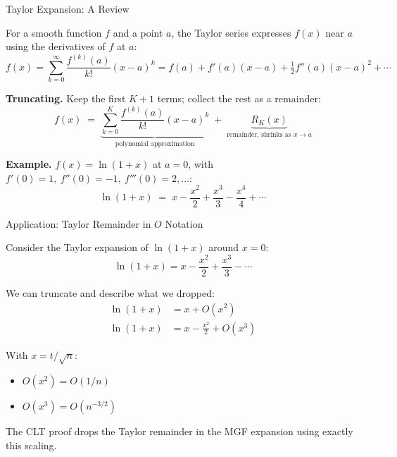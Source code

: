 \documentclass[handout, aspectratio=169]{beamer}
\numberwithin{equation}{section}
\begin{document}

\begin{frame}{Taylor Expansion: A Review}

For a smooth function $f$ and a point $a$, the Taylor series expresses $f(x)$ near $a$ using the derivatives of $f$ at $a$:
\[
f(x) = \sum_{k=0}^{\infty} \frac{f^{(k)}(a)}{k!}(x-a)^k = f(a) + f'(a)(x-a) + \tfrac{1}{2}f''(a)(x-a)^2 + \cdots
\]

\pause

\textbf{Truncating.} Keep the first $K{+}1$ terms; collect the rest as a remainder:
\[
f(x) \;=\; \underbrace{\sum_{k=0}^{K} \frac{f^{(k)}(a)}{k!}(x-a)^k}_{\text{polynomial approximation}} \;+\; \underbrace{R_K(x)}_{\text{remainder, shrinks as }x\to a}
\]

\pause

\textbf{Example.} $f(x) = \ln(1+x)$ at $a = 0$, with $f'(0)=1,\ f''(0)=-1,\ f'''(0)=2,\ldots$:
\[
\ln(1+x) \;=\; x - \frac{x^2}{2} + \frac{x^3}{3} - \frac{x^4}{4} + \cdots
\]

\end{frame}


\begin{frame}{Application: Taylor Remainder in $O$ Notation}

Consider the Taylor expansion of $\ln(1+x)$ around $x = 0$:
$$\ln(1 + x) = x - \frac{x^2}{2} + \frac{x^3}{3} - \cdots$$

\pause

We can truncate and describe what we dropped:
\begin{align*}
\ln(1+x) &= x + O(x^2) \tag{first-order: remainder $\leq C x^2$} \\
\ln(1+x) &= x - \frac{x^2}{2} + O(x^3) \tag{second-order: remainder $\leq C x^3$}
\end{align*}

\pause

With $x = t/\sqrt{n}$:
\begin{itemize}
  \item $O(x^2) = O(1/n)$
  \item $O(x^3) = O(n^{-3/2})$
\end{itemize}
The CLT proof drops the Taylor remainder in the MGF expansion using exactly this scaling.

\end{frame}

\end{document}
